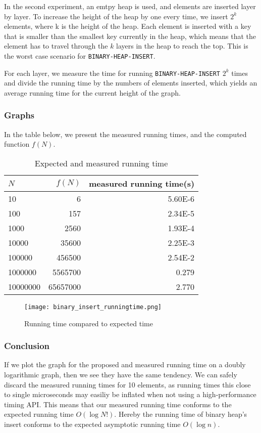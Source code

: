 \documentclass[a4paper,oneside,11pt]{article}
\begin{document}
\begin{itemize}
In the second experiment, an emtpy heap is used, and elements are inserted layer by layer. To increase the height of the heap by one every time, we insert $2^k$ elements, where k is the height of the heap. Each element is inserted with a key that is smaller than the smallest key currently in the heap, which means that the element has to travel through the $k$ layers in the heap to reach the top. This is the worst case scenario for \texttt{BINARY-HEAP-INSERT}.

For each layer, we measure the time for running \texttt{BINARY-HEAP-INSERT} $2^k$ times and divide the running time by the numbers of elements inserted, which yields an average running time for the current height of the graph.
\subsubsection*{Graphs}

In the table below, we present the measured running times, and the computed function $f(N)$.
\begin{table}
  \begin{center}
    \begin{tabular}{l|r|r}
      $N$ & $f(N)$ & measured running time(s)\\
      \hline
      10       & 6         & \num{5.60E-6}\\
      100      & 157       & \num{2.34E-5}\\
      1000     & 2560      & \num{1.93E-4}\\
      10000    & 35600     & \num{2.25E-3}\\
      100000   & 456500    & \num{2.54E-2}\\
      1000000  & 5565700   & \num{0.279}\\
      10000000 & 65657000  & \num{2.770}
    \end{tabular}
    \caption{Expected and measured running time}
  \end{center}
\end{table}
\begin{figure}
  \texttt{[image: binary\_insert\_runningtime.png]}
  \caption{Running time compared to expected time}
\end{figure}

\subsubsection*{Conclusion}
If we plot the graph for the proposed and measured running time on a doubly logarithmic graph, then we see they have the same tendency. We can safely discard the measured running times for 10 elements, as running times this close to single microseconds may easiliy be inflated when not using a high-performance timing API.
This means that our measured running time conforms to the expected running time $O(\log N!)$. Hereby the running time of binary heap's insert conforms to the expected asymptotic running time $O(\log n)$.


\end{itemize}
\end{document}
